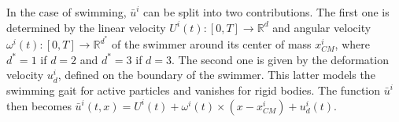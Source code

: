 \documentclass[graybox]{svmult}
\newcommand{\Fluid}{\mathcal{F}} %
\newcommand{\Real}{\mathbb{R}} %
\newcommand{\Alemap}{\mathcal{A}} %
\newcommand{\ALE}{ALE} %
\newcommand{\Vel}{u} %
\newcommand{\Pres}{p} %
\newcommand{\Density}{\rho} %
\newcommand{\tvel}{U} %
\newcommand{\angvel}{\omega} %
\newcommand{\CenterMassi}{x_{CM}^i}
\newcommand{\R}{\mathbb{R}}
\begin{document}
In the case of swimming, $\bar{\Vel}^i$ can be split into two contributions. The first one is determined by the linear velocity $\tvel^i(t): [0,T]\to\R^d$ and angular velocity  $\angvel^i(t):[0,T]\to \R^{d^*}$ of the swimmer around its center of mass $\CenterMassi$, where $d^*=1$ if $d=2$ and $d^*=3$ if $d=3$.  The second one is given by the deformation velocity $u_d^i$, defined on the boundary of the swimmer. This latter models the swimming gait for active particles and vanishes for rigid bodies. The function $\bar{u}^i$ then becomes $\bar{\Vel}^i(t,x) = \tvel^i(t) + \angvel^i(t)\times (x-\CenterMassi)+ \Vel_d^i(t)$.




\end{document}
